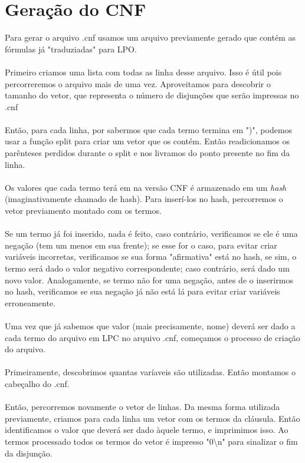 \documentclass[a4paper]{article}
\begin{document}
\section{Geração do CNF}
Para gerar o arquivo .cnf usamos um arquivo previamente gerado que contém as fórmulas já "traduziadas" para LPO.\\\\
Primeiro criamos uma lista com todas as linha desse arquivo. Isso é útil pois percorreremos o arquivo mais de uma vez. Aproveitamos para descobrir o tamanho do vetor, que representa o número de disjunções que serão impressas no .cnf\\\\
Então, para cada linha, por sabermos que cada termo termina em ")", podemos usar a função split para criar um vetor que os contém. Então readicionamos os parênteses perdidos durante o split e nos livramos do ponto presente no fim da linha.\\\\
Os valores que cada termo terá em na versão CNF é armazenado em um \textit{hash} (imaginativamente chamado de hash). Para inserí-los no hash, percorremos o vetor previamento montado com os termos.\\\\ Se um termo já foi inserido, nada é feito, caso contrário, verificamos se ele é uma negação (tem um menos em sua frente); se esse for o caso, para evitar criar variáveis incorretas, verificamos se sua forma "afirmativa" está no hash, se sim, o termo será dado o valor negativo correspondente; caso contrário, será dado um novo valor. Analogamente, se termo não for uma negação, antes de o inserirmos no hash, verificamos se sua negação já não está lá para evitar criar variáveis erroneamente.\\\\
Uma vez que já sabemos que valor (mais precisamente, nome) deverá ser dado a cada termo do arquivo em LPC no arquivo .cnf, começamos o processo de criação do arquivo.\\\\
Primeiramente, descobrimos quantas varíaveis são utilizadas. Então montamos o cabeçalho do .cnf.\\\\
Então, percorremos novamente o vetor de linhas. Da mesma forma utilizada previamente, criamos para cada linha um vetor com os termos da cláusula. Então identificamos o valor que deverá ser dado àquele termo, e imprimimos isso. Ao termos processado todos os termos do vetor é impresso "0\textbackslash n" para sinalizar o fim da disjunção.
\end{document}

